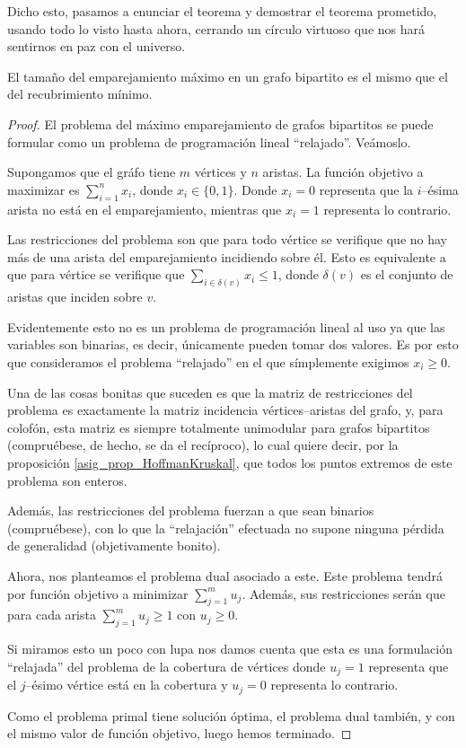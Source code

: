 Dicho esto, pasamos a enunciar el teorema y demostrar el teorema prometido, usando todo lo visto hasta ahora, cerrando un círculo virtuoso que nos hará sentirnos en paz con el universo.
\begin{theo}
	\label{asig_teo_konig}
	El tamaño del emparejamiento máximo en un grafo bipartito es el mismo que el del recubrimiento mínimo.
\end{theo}
\begin{proof}
	El problema del máximo emparejamiento de grafos bipartitos se puede formular como un problema de programación lineal ``relajado''. Veámoslo.
	
	Supongamos que el gráfo tiene $m$ vértices y $n$ aristas. La función objetivo a maximizar es $\sum_{i=1}^{n}x_i$, donde $x_i\in\{0,1\}$. Donde $x_i=0$ representa que la $i$--ésima arista no está en el emparejamiento, mientras que $x_i=1$ representa lo contrario.
	
	Las restricciones del problema son que para todo vértice se verifique que no hay más de una arista del emparejamiento incidiendo sobre él. Esto es equivalente a que para vértice se verifique que $\sum_{i\in\delta(v)}x_i\leq 1$, donde $\delta(v)$ es el conjunto de aristas que inciden sobre $v$.
	
	Evidentemente esto no es un problema de programación lineal al uso ya que las variables son binarias, es decir, únicamente pueden tomar dos valores. Es por esto que consideramos el problema ``relajado'' en el que símplemente exigimos $x_i\geq0$.
	
	Una de las cosas bonitas que suceden es que la matriz de restricciones del problema es exactamente la matriz incidencia vértices--aristas del grafo, y, para colofón, esta matriz es siempre totalmente unimodular para grafos bipartitos (compruébese, de hecho, se da el recíproco), lo cual quiere decir, por la proposición \ref{asig_prop_HoffmanKruskal}, que todos los puntos extremos de este problema son enteros.
	
	Además, las restricciones del problema fuerzan a que sean binarios (compruébese), con lo que la ``relajación'' efectuada no supone ninguna pérdida de generalidad (objetivamente bonito).
	
	Ahora, nos planteamos el problema dual asociado a este. Este problema tendrá por función objetivo a minimizar $\sum_{j=1}^{m}u_j$. Además, sus restricciones serán que para cada arista $\sum_{j=1}^{m}u_j\geq 1$ con $u_j\geq 0$. 
	
	Si miramos esto un poco con lupa nos damos cuenta que esta es una formulación ``relajada'' del problema de la cobertura de vértices donde $u_j=1$ representa que el $j$--ésimo vértice está en la cobertura y $u_j=0$ representa lo contrario.
	
	Como el problema primal tiene solución óptima, el problema dual también, y con el mismo valor de función objetivo, luego hemos terminado.
\end{proof}
